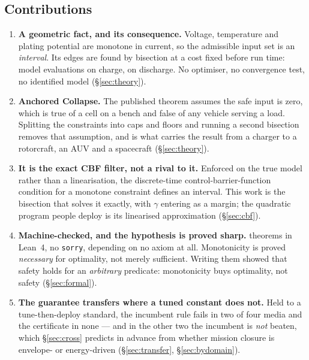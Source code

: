 \documentclass[11pt,letterpaper]{article}
\theoremstyle{definition}
\theoremstyle{remark}
\begin{document}
\subsection{Contributions}

\begin{enumerate}\itemsep2pt
\item \textbf{A geometric fact, and its consequence.} Voltage, temperature and plating potential
are monotone in current, so the admissible input set is an \emph{interval}. Its edges are found
by bisection at a cost fixed before run time: \evalCharge{} model evaluations on charge,
\evalDischarge{} on discharge. No optimiser, no convergence test, no identified model
(\S\ref{sec:theory}).

\item \textbf{Anchored Collapse.} The published theorem assumes the safe input is zero, which is
true of a cell on a bench and false of any vehicle serving a load. Splitting the constraints into
caps and floors and running a second bisection removes that assumption, and is what carries the
result from a charger to a rotorcraft, an AUV and a spacecraft (\S\ref{sec:theory}).

\item \textbf{It is the exact CBF filter, not a rival to it.} Enforced on the true model rather
than a linearisation, the discrete-time control-barrier-function condition for a monotone
constraint defines an interval. This work is the bisection that solves it exactly, with $\gamma$
entering as a margin; the quadratic program people deploy is its linearised approximation
(\S\ref{sec:cbf}).

\item \textbf{Machine-checked, and the hypothesis is proved sharp.} \leanThms{} theorems in
Lean~4, no \texttt{sorry}, \leanFreeWord{} depending on no axiom at all. Monotonicity is proved
\emph{necessary} for optimality, not merely sufficient. Writing them showed that safety holds for an
\emph{arbitrary} predicate: monotonicity buys optimality, not safety (\S\ref{sec:formal}).

\item \textbf{The guarantee transfers where a tuned constant does not.} Held to a
tune-then-deploy standard, the incumbent rule fails in two of four media and the certificate in
none --- and in the other two the incumbent is \emph{not} beaten, which
\S\ref{sec:cross} predicts in advance from whether mission closure is envelope- or energy-driven
(\S\ref{sec:transfer}, \S\ref{sec:bydomain}).


\end{enumerate}
\end{document}

